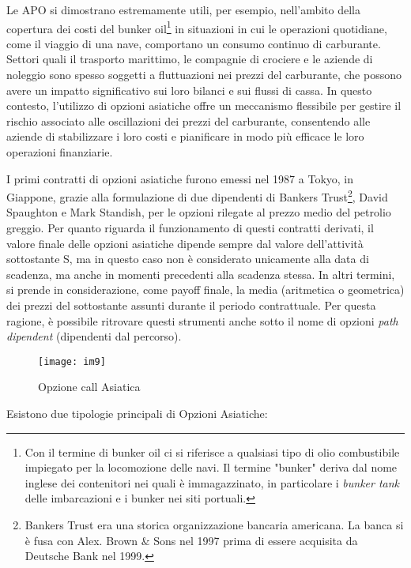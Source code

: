 \documentclass[12pt,a4paper]{report}
\begin{document}
Le APO si dimostrano estremamente utili, per esempio, nell'ambito della copertura dei costi del bunker oil\footnote{Con il termine di bunker oil ci si riferisce a qualsiasi tipo di olio combustibile impiegato per la locomozione delle navi. Il termine "bunker" deriva dal nome inglese dei contenitori nei quali è immagazzinato, in particolare i \textit{bunker tank} delle imbarcazioni e i bunker nei siti portuali.} in situazioni in cui le operazioni quotidiane, come il viaggio di una nave, comportano un consumo continuo di carburante. Settori quali il trasporto marittimo, le compagnie di crociere e le aziende di noleggio sono spesso soggetti a fluttuazioni nei prezzi del carburante, che possono avere un impatto significativo sui loro bilanci e sui flussi di cassa. In questo contesto, l'utilizzo di opzioni asiatiche offre un meccanismo flessibile per gestire il rischio associato alle oscillazioni dei prezzi del carburante, consentendo alle aziende di stabilizzare i loro costi e pianificare in modo più efficace le loro operazioni finanziarie.

I primi contratti di opzioni asiatiche furono emessi nel 1987 a Tokyo, in Giappone, grazie alla formulazione di due dipendenti di Bankers Trust\footnote{Bankers Trust era una storica organizzazione bancaria americana. La banca si è fusa con Alex. Brown $\&$ Sons nel 1997 prima di essere acquisita da Deutsche Bank nel 1999.}, David Spaughton e Mark Standish, per le opzioni rilegate al prezzo medio del petrolio greggio. Per quanto riguarda il funzionamento di questi contratti derivati, il valore finale delle opzioni asiatiche dipende sempre dal valore dell'attività sottostante S, ma in questo caso non è considerato unicamente alla data di scadenza, ma anche in momenti precedenti alla scadenza stessa. In altri termini, si prende in considerazione, come payoff finale, la media (aritmetica o geometrica) dei prezzi del sottostante assunti durante il periodo contrattuale. Per questa ragione, è possibile ritrovare questi strumenti anche sotto il nome di opzioni \textit{path dipendent} (dipendenti dal percorso).


\begin{figure}[htbp]
    \centering
    \texttt{[image: im9]}
    \caption{Opzione call Asiatica}
    \label{fig:grafico}
\end{figure}

Esistono due tipologie principali di Opzioni Asiatiche:
\end{document}

